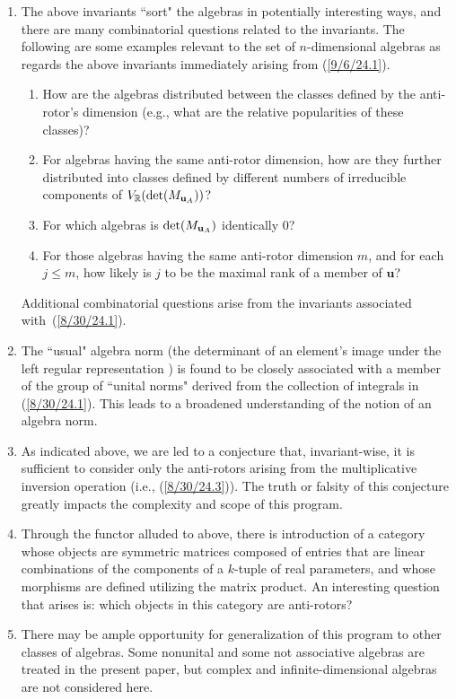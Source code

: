\documentclass{amsart}
\numberwithin{equation}{section}
\theoremstyle{definition}
\numberwithin{theorem}{section}
\begin{document}
\begin{enumerate}
\item The above invariants ``sort" the algebras in potentially interesting ways, and there are many combinatorial questions related to the invariants.  The following are some examples relevant to the set of $n$-dimensional algebras as regards the above invariants immediately arising from (\ref{9/6/24.1}). \begin{enumerate} \item How are the algebras distributed between the classes defined by the anti-rotor's dimension (e.g., what are the relative popularities of these classes)?  \item For algebras having the same anti-rotor dimension, how are they further distributed into classes defined by different numbers of irreducible components of $V_\mathbb{R}({\rm det}(M_{\mathbf{u}_A}))$?  \item For which algebras is ${\rm det}(M_{\mathbf{u}_A})$ identically $0$?   \item For those algebras having the same anti-rotor dimension $m$, and for each $j\le m$, how likely is $j$ to be the maximal rank of a member of $\mathbf{u}$?   \end{enumerate}  
Additional combinatorial questions arise from the invariants associated \mbox{with (\ref{8/30/24.1})}. 
\item  The ``usual" algebra norm (the determinant of an element's image under the left regular representation \cite{bourbaki:1989}) is found to be closely associated with a member of the group of ``unital norms" derived from the collection of integrals in (\ref{8/30/24.1}).  This leads to a broadened understanding of the notion of an algebra norm.
\item As indicated above, we are led to a conjecture that, invariant-wise, it is sufficient to consider only the anti-rotors arising from the multiplicative inversion operation (i.e., (\ref{8/30/24.3})).  The truth or falsity of this conjecture greatly impacts the complexity and scope of this program. 
\item Through the functor alluded to above, there is introduction of a category whose objects are symmetric matrices composed of entries that are linear combinations of the components of a $k$-tuple of real parameters, and whose morphisms are defined utilizing the matrix product.  An interesting question that arises is:  which objects in this category are anti-rotors?
\item There may be ample opportunity for generalization of this program to other classes of algebras.  Some nonunital and some not associative algebras are treated in the present paper, but complex and infinite-dimensional algebras are not considered here.
\end{enumerate}
\end{document}
